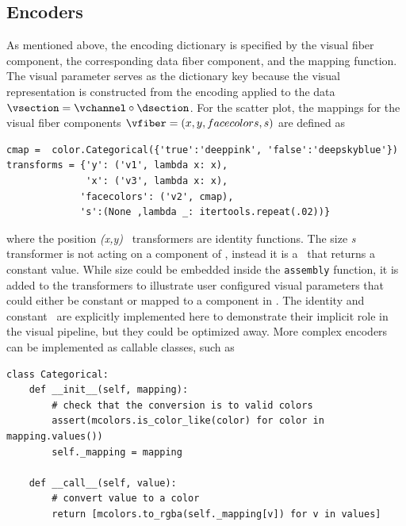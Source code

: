 \documentclass[../main.tex]{subfiles}
\begin{document}
\subsection{Encoders \vchannel}
\label{sec:code_channels}
As mentioned above, the encoding dictionary is specified by the visual fiber component, the corresponding data fiber component, and the mapping function. The visual parameter serves as the dictionary key because the visual representation is constructed from the encoding applied to the data  $\vsection = \vchannel \circ \dsection$. For the scatter plot, the mappings for the visual fiber components $\vfiber=(x,y, facecolors, s)$ are defined as
\begin{verbatim}
cmap =  color.Categorical({'true':'deeppink', 'false':'deepskyblue'})
transforms = {'y': ('v1', lambda x: x),       
              'x': ('v3', lambda x: x),
             'facecolors': ('v2', cmap), 
             's':(None ,lambda _: itertools.repeat(.02))}
\end{verbatim}
where the position \textit{(x,y)} \vchannel\ transformers are identity functions. The size \textit{s} transformer is not acting on a component of \dfiber, instead it is a \vchannel\ that returns a constant value. While size could be embedded inside the \texttt{assembly} function, it is added to the transformers to illustrate user configured visual parameters that could either be constant or mapped to a component in \dfiber. The identity and constant \vchannel\ are explicitly implemented here to demonstrate their implicit role in the visual pipeline, but they could be optimized away. More complex encoders can be implemented as callable classes, such as 

\begin{verbatim}
class Categorical:
    def __init__(self, mapping):
        # check that the conversion is to valid colors
        assert(mcolors.is_color_like(color) for color in mapping.values())
        self._mapping = mapping

    def __call__(self, value):
        # convert value to a color
        return [mcolors.to_rgba(self._mapping[v]) for v in values]
\end{verbatim}
\end{document}
